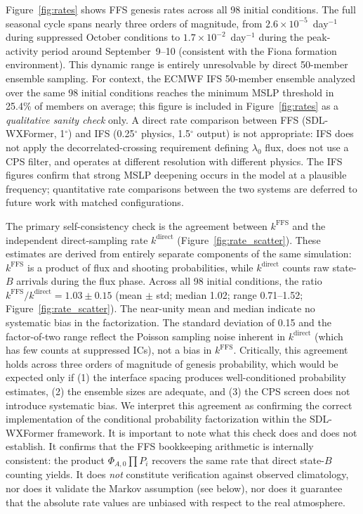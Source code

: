 \documentclass[11pt]{article}
\begin{document}
Figure~\ref{fig:rates} shows FFS genesis rates across all 98 initial conditions.
The full seasonal cycle spans nearly three orders of magnitude,
from $2.6\times10^{-5}$~day$^{-1}$ during suppressed October conditions to
$1.7\times10^{-2}$~day$^{-1}$ during the peak-activity period around September~9--10
(consistent with the Fiona formation environment). This dynamic range is entirely unresolvable by direct 50-member ensemble sampling.
For context, the ECMWF IFS 50-member ensemble analyzed over the same 98 initial
conditions reaches the minimum MSLP threshold in 25.4\% of members on average;
this figure is included in Figure~\ref{fig:rates} as a \textit{qualitative sanity check}
only. A direct rate comparison between FFS (SDL-WXFormer, 1$^\circ$) and IFS
(0.25$^\circ$ physics, 1.5$^\circ$ output) is not appropriate: IFS does not apply
the decorrelated-crossing requirement defining $\lambda_0$ flux, does not use a CPS
filter, and operates at different resolution with different physics.
The IFS figures confirm that strong MSLP deepening occurs in the model at a
plausible frequency; quantitative rate comparisons between the two systems
are deferred to future work with matched configurations.

The primary self-consistency check is the agreement between $k^{\text{FFS}}$ and the
independent direct-sampling rate $k^{\text{direct}}$ (Figure~\ref{fig:rate_scatter}).
These estimates are derived from entirely separate components of the same simulation:
$k^{\text{FFS}}$ is a product of flux and shooting probabilities, while $k^{\text{direct}}$
counts raw state-$B$ arrivals during the flux phase.
Across all 98 initial conditions, the ratio $k^{\text{FFS}}/k^{\text{direct}} = 1.03 \pm 0.15$
(mean $\pm$ std; median 1.02; range 0.71--1.52; Figure~\ref{fig:rate_scatter}).
The near-unity mean and median indicate no systematic bias in the factorization.
The standard deviation of 0.15 and the factor-of-two range reflect the Poisson
sampling noise inherent in $k^{\text{direct}}$ (which has few counts at suppressed ICs),
not a bias in $k^{\text{FFS}}$.
Critically, this agreement holds across three orders of magnitude of genesis probability,
which would be expected only if (1) the interface spacing produces well-conditioned
probability estimates, (2) the ensemble sizes are adequate, and (3) the CPS screen
does not introduce systematic bias.
We interpret this agreement as confirming the correct implementation of the conditional
probability factorization within the SDL-WXFormer framework.
It is important to note what this check does and does not establish.
It confirms that the FFS bookkeeping arithmetic is internally consistent: the product
$\Phi_{A,0}\prod P_i$ recovers the same rate that direct state-$B$ counting yields.
It does \emph{not} constitute verification against observed climatology, nor does it
validate the Markov assumption (see below), nor does it guarantee that the absolute
rate values are unbiased with respect to the real atmosphere.
\end{document}
